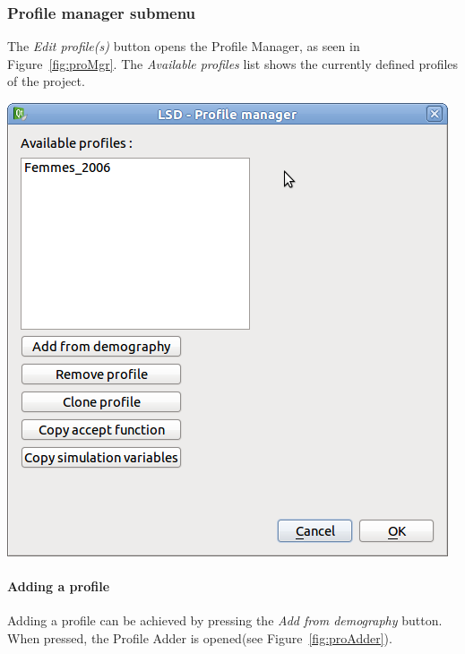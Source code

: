 \documentclass[a4paper,11pt]{report}
\begin{document}
\subsubsection{Profile manager submenu}
The \emph{Edit profile(s)} button opens the Profile Manager, as seen in Figure~\ref{fig:proMgr}. The \emph{Available profiles} list shows the currently defined profiles of the project.
\begin{center}
\includegraphics[scale=0.3]{Pictures/Population/Submenu/ProMgr.png}
\label{fig:proMgr}
\end{center}

\paragraph{Adding a profile}
Adding a profile can be achieved by pressing the \emph{Add from demography} button. When pressed, the Profile Adder is opened(see Figure~\ref{fig:proAdder}).
 
\end{document}
